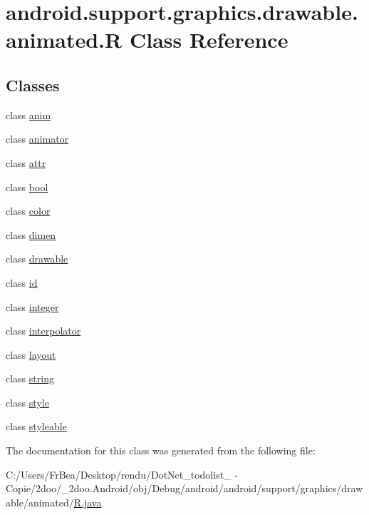 \hypertarget{classandroid_1_1support_1_1graphics_1_1drawable_1_1animated_1_1_r}{
\section{android.support.graphics.drawable.animated.R Class Reference}
\label{classandroid_1_1support_1_1graphics_1_1drawable_1_1animated_1_1_r}
}
\subsection*{Classes}
\begin{CompactItemize}
\item 
class \hyperlink{classandroid_1_1support_1_1graphics_1_1drawable_1_1animated_1_1_r_1_1anim}{anim}
\item 
class \hyperlink{classandroid_1_1support_1_1graphics_1_1drawable_1_1animated_1_1_r_1_1animator}{animator}
\item 
class \hyperlink{classandroid_1_1support_1_1graphics_1_1drawable_1_1animated_1_1_r_1_1attr}{attr}
\item 
class \hyperlink{classandroid_1_1support_1_1graphics_1_1drawable_1_1animated_1_1_r_1_1bool}{bool}
\item 
class \hyperlink{classandroid_1_1support_1_1graphics_1_1drawable_1_1animated_1_1_r_1_1color}{color}
\item 
class \hyperlink{classandroid_1_1support_1_1graphics_1_1drawable_1_1animated_1_1_r_1_1dimen}{dimen}
\item 
class \hyperlink{classandroid_1_1support_1_1graphics_1_1drawable_1_1animated_1_1_r_1_1drawable}{drawable}
\item 
class \hyperlink{classandroid_1_1support_1_1graphics_1_1drawable_1_1animated_1_1_r_1_1id}{id}
\item 
class \hyperlink{classandroid_1_1support_1_1graphics_1_1drawable_1_1animated_1_1_r_1_1integer}{integer}
\item 
class \hyperlink{classandroid_1_1support_1_1graphics_1_1drawable_1_1animated_1_1_r_1_1interpolator}{interpolator}
\item 
class \hyperlink{classandroid_1_1support_1_1graphics_1_1drawable_1_1animated_1_1_r_1_1layout}{layout}
\item 
class \hyperlink{classandroid_1_1support_1_1graphics_1_1drawable_1_1animated_1_1_r_1_1string}{string}
\item 
class \hyperlink{classandroid_1_1support_1_1graphics_1_1drawable_1_1animated_1_1_r_1_1style}{style}
\item 
class \hyperlink{classandroid_1_1support_1_1graphics_1_1drawable_1_1animated_1_1_r_1_1styleable}{styleable}
\end{CompactItemize}


The documentation for this class was generated from the following file:\begin{CompactItemize}
\item 
C:/Users/FrBea/Desktop/rendu/DotNet\_\-todolist\_ - Copie/2doo/\_\-2doo.Android/obj/Debug/android/android/support/graphics/drawable/animated/\hyperlink{android_2support_2graphics_2drawable_2animated_2_r_8java}{R.java}\end{CompactItemize}
